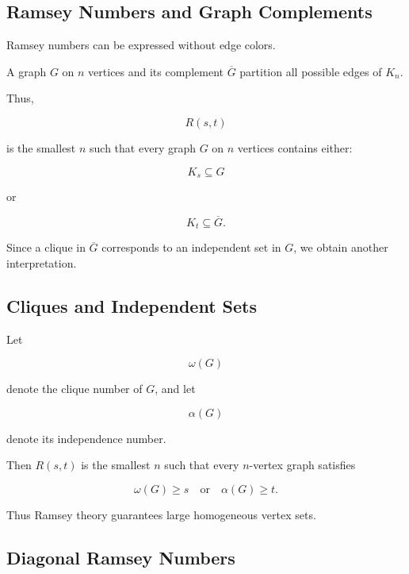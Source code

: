 \subsection{Ramsey Numbers and Graph Complements}
\label{subsec:ramsey-graph-complements}

Ramsey numbers can be expressed without edge colors.

A graph \(G\) on \(n\) vertices and its complement \(\overline{G}\)
partition all possible edges of \(K_n\).

Thus,

\[
R(s,t)
\]

is the smallest \(n\) such that every graph \(G\) on \(n\) vertices
contains either:

\[
\boxed{
K_s\subseteq G
}
\]

or

\[
\boxed{
K_t\subseteq\overline{G}.
}
\]

Since a clique in \(\overline{G}\) corresponds to an independent set in
\(G\), we obtain another interpretation.

\subsection{Cliques and Independent Sets}
\label{subsec:ramsey-cliques-independent}

Let

\[
\omega(G)
\]

denote the clique number of \(G\), and let

\[
\alpha(G)
\]

denote its independence number.

Then \(R(s,t)\) is the smallest \(n\) such that every \(n\)-vertex graph
satisfies

\[
\boxed{
\omega(G)\geq s
\quad\text{or}\quad
\alpha(G)\geq t.
}
\]

Thus Ramsey theory guarantees large homogeneous vertex sets.

\subsection{Diagonal Ramsey Numbers}
\label{subsec:diagonal-ramsey-numbers}

